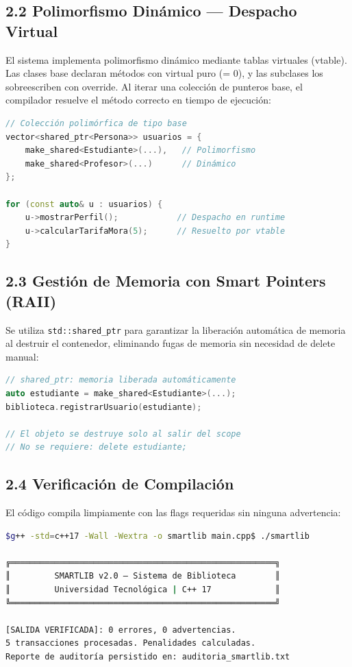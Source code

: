 \documentclass[12pt,a4paper]{article}
\begin{document}
\subsection{2.2 Polimorfismo Dinámico — Despacho Virtual}
El sistema implementa polimorfismo dinámico mediante tablas virtuales (vtable). Las clases base declaran métodos con virtual puro (= 0), y las subclases los sobreescriben con override. Al iterar una colección de punteros base, el compilador resuelve el método correcto en tiempo de ejecución:

\begin{lstlisting}[language=C++]
// Colección polimórfica de tipo base
vector<shared_ptr<Persona>> usuarios = {
    make_shared<Estudiante>(...),   // Polimorfismo
    make_shared<Profesor>(...)      // Dinámico
};

for (const auto& u : usuarios) {
    u->mostrarPerfil();            // Despacho en runtime
    u->calcularTarifaMora(5);      // Resuelto por vtable
}
\end{lstlisting}

\subsection{2.3 Gestión de Memoria con Smart Pointers (RAII)}
Se utiliza \texttt{std::shared\_ptr} para garantizar la liberación automática de memoria al destruir el contenedor, eliminando fugas de memoria sin necesidad de delete manual:

\begin{lstlisting}[language=C++]
// shared_ptr: memoria liberada automáticamente
auto estudiante = make_shared<Estudiante>(...);
biblioteca.registrarUsuario(estudiante);

// El objeto se destruye solo al salir del scope
// No se requiere: delete estudiante;
\end{lstlisting}

\subsection{2.4 Verificación de Compilación}
El código compila limpiamente con las flags requeridas sin ninguna advertencia:

\begin{lstlisting}[language=bash]
$g++ -std=c++17 -Wall -Wextra -o smartlib main.cpp$ ./smartlib

╔══════════════════════════════════════════════════════╗
║         SMARTLIB v2.0 — Sistema de Biblioteca        ║
║         Universidad Tecnológica | C++ 17             ║
╚══════════════════════════════════════════════════════╝

[SALIDA VERIFICADA]: 0 errores, 0 advertencias.
5 transacciones procesadas. Penalidades calculadas.
Reporte de auditoría persistido en: auditoria_smartlib.txt
\end{lstlisting}
\end{document}
